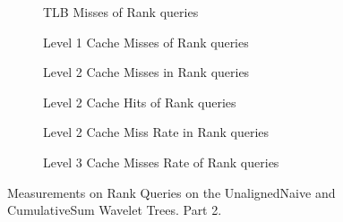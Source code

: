 \begin{figure}\tiny

\begin{subfigure}{0.48\textwidth}
	
	\caption{TLB Misses of Rank queries}
	\label{fig:CumulativeSumRankTLBMiss}
\end{subfigure}
\hfill
\begin{subfigure}{0.48\textwidth}
	
	\caption{Level 1 Cache Misses of Rank queries}
	\label{fig:CumulativeSumRankL1CM}
\end{subfigure}

\begin{subfigure}{0.48\textwidth}
	
	\caption{Level 2 Cache Misses in Rank queries}
	\label{fig:CumulativeSumRankL2CM}
\end{subfigure}
\hfill
\begin{subfigure}{0.48\textwidth}
	
	\caption{Level 2 Cache Hits of Rank queries}
	\label{fig:CumulativeSumRankL2CHits}
\end{subfigure}

\begin{subfigure}{0.48\textwidth}
	
	\caption{Level 2 Cache Miss Rate in Rank queries}
	\label{fig:CumulativeSumRankL2CMRate}
\end{subfigure}
\hfill
\begin{subfigure}{0.48\textwidth}
	
	\caption{Level 3 Cache Misses Rate of Rank queries}
	\label{fig:CumulativeSumRankL3CM}
\end{subfigure}

\caption{Measurements on Rank Queries on the UnalignedNaive and CumulativeSum Wavelet Trees. Part 2.}
\label{fig:CumulativeSumRank}
\end{figure}




\clearpage




